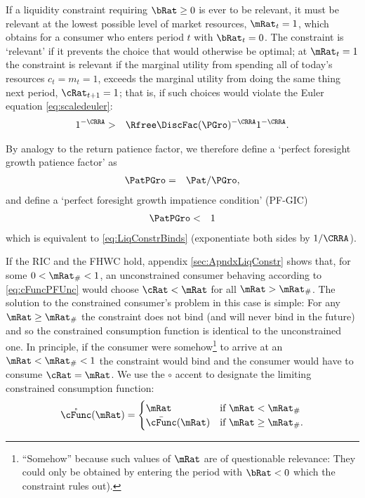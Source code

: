 \documentclass[titlepage]{\econtex}\providecommand{\texname}{BufferStockTheory}
\begin{document}
If a liquidity constraint requiring $\bRat \geq 0$ is ever to be relevant, it must be
relevant at the lowest possible level of market resources,
$\mRat_{t}=1$, which obtains for a consumer who enters period $t$ with
$\bRat_{t}=0$.  The constraint is `relevant' if
it prevents the choice that would otherwise be optimal; at
$\mRat_{t}=1$ the constraint is relevant if the marginal utility from spending all of today's
resources $c_{t}=m_{t}=1$, exceeds the marginal utility from
doing the same thing next period, $\cRat_{t+1}=1$; that is, if such
choices would violate the Euler equation \eqref{eq:scaledeuler}:
\begin{eqnarray}
    1^{-\CRRA} & > & \Rfree \DiscFac (\PGro)^{-\CRRA}1^{-\CRRA}  \label{eq:LiqConstrBinds}.
\end{eqnarray}

\hypertarget{PFGIC}{}
By analogy to the return patience factor, we therefore define a `perfect
foresight growth patience factor' as
\begin{eqnarray}
  \PatPGro & = & {\Pat}/\PGro,  \label{eq:PFGPF}
\end{eqnarray}
and define a `perfect foresight growth impatience condition' (PF-GIC)
\begin{eqnarray}
  \label{eq:PFGIC}
  \PatPGro &  < &  1
\end{eqnarray}
which is equivalent to \eqref{eq:LiqConstrBinds} (exponentiate both
sides by $1/\CRRA$).

If the RIC and the FHWC hold, appendix \ref{sec:ApndxLiqConstr} shows
that, for some $0 < \mRat_{\#} < 1$, an unconstrained consumer behaving according to
\eqref{eq:cFuncPFUnc} would choose $\cRat < \mRat$ for all $\mRat >
\mRat_{\#}$.  The solution to the
constrained consumer's problem in this case is simple: For any $\mRat
\geq \mRat_{\#}$ the constraint does not bind (and will never bind in
the future) and so the constrained consumption function is identical
to the unconstrained one.  In principle, if the consumer were somehow\footnote{``Somehow'' because such values
of $\mRat$ are of questionable relevance: They could only be
obtained by entering the period with $\bRat < 0$ which the constraint
rules out).}
to arrive at an $\mRat < \mRat_{\#} < 1$ the constraint would bind and
the consumer would have to consume $\cRat=\mRat$.  We use the $\circ$ accent to designate the limiting
constrained consumption function:
\begin{equation}
\mathring{\cFunc}(\mRat)=
\begin{cases}
 \mRat & \text{if $\mRat < \mRat_{\#}$} \\
 \bar{\cFunc}(\mRat)  & \text{if $\mRat \geq \mRat_{\#}$.}
\end{cases}
\end{equation}
\end{document}
